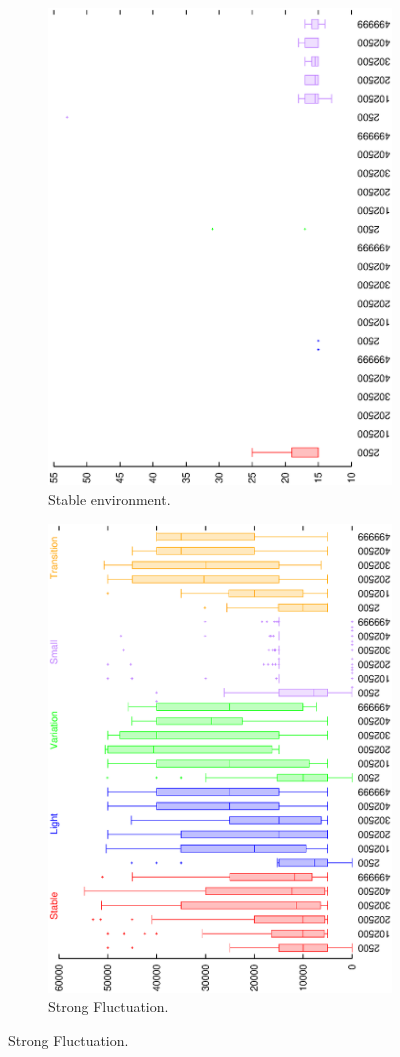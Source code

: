 \documentclass[letterpaper]{article}
\begin{document}
\begin{figure}[H]
\begin{subfigure}{.25\textwidth}
  \centering
  \includegraphics[width=.7\linewidth, angle =-90]{boxendingsFailedstable.eps}
  \caption{Stable environment.}
  \label{fig:sfig1}
\end{subfigure}%
\begin{subfigure}{.25\textwidth}
  \centering
  \includegraphics[width=.7\linewidth, angle =-90]{boxendingsFailedvariation.eps}
  \caption{Strong Fluctuation.}
  \label{fig:sfig2}
\end{subfigure}


\end{figure}
\end{document}
